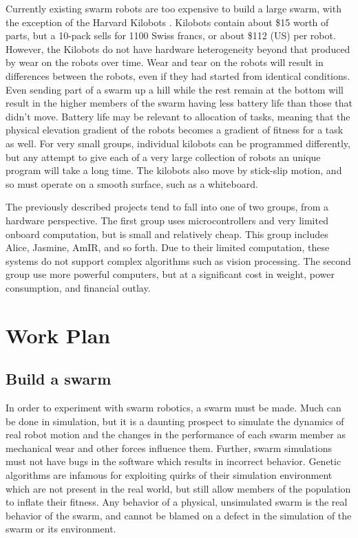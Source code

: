 \documentclass[]{article}
\begin{document}
Currently existing swarm robots are too expensive to build a large swarm, with the exception of the Harvard Kilobots \cite{rubenstein2014kilobot}. 
Kilobots contain about \$15 worth of parts, but a 10-pack sells for 1100 Swiss francs, or about \$112 (US) per robot. 
However, the Kilobots do not have hardware heterogeneity beyond that produced by wear on the robots over time. 
Wear and tear on the robots will result in differences between the robots, even if they had started from identical conditions. 
Even sending part of a swarm up a hill while the rest remain at the bottom will result in the higher members of the swarm having less battery life than those that didn't move. 
Battery life may be relevant to allocation of tasks, meaning that the physical elevation gradient of the robots becomes a gradient of fitness for a task as well. 
For very small groups, individual kilobots can be programmed differently, but any attempt to give each of a very large collection of robots an unique program will take a long time. 
The kilobots also move by stick-slip motion, and so must operate on a smooth surface, such as a whiteboard. 

The previously described projects tend to fall into one of two groups, from a hardware perspective. 
The first group uses microcontrollers and very limited onboard computation, but is small and relatively cheap.
This group includes Alice, Jasmine, AmIR, and so forth.
Due to their limited computation, these systems do not support complex algorithms such as vision processing. 
The second group use more powerful computers, but at a significant cost in weight, power consumption, and financial outlay.



\section{Work Plan}

\subsection{Build a swarm}

In order to experiment with swarm robotics, a swarm must be made.
Much can be done in simulation, but it is a daunting prospect to simulate the dynamics of real robot motion and the changes in the performance of each swarm member as mechanical wear and other forces influence them. 
Further, swarm simulations must not have bugs in the software which results in incorrect behavior. 
Genetic algorithms are infamous for exploiting quirks of their simulation environment which are not present in the real world, but still allow members of the population to inflate their fitness. 
Any behavior of a physical, unsimulated swarm is the real behavior of the swarm, and cannot be blamed on a defect in the simulation of the swarm or its environment. 
\end{document}
